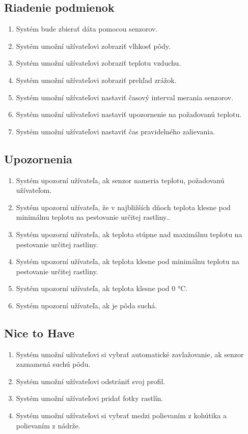 \documentclass[twoside]{ctuthesis}
\theoremstyle{plain}
\theoremstyle{definition}
\theoremstyle{note}
\begin{document}
\subsection*{Riadenie podmienok}
\begin{enumerate}
\item Systém bude zbierať dáta pomocou senzorov.
\item Systém umožní užívateľovi zobraziť  vlhkosť pôdy.
\item Systém umožní užívateľovi zobraziť  teplotu vzduchu. 
\item Systém umožní užívateľovi zobraziť prehľad zrážok.
\item Systém umožní užívateľovi nastaviť časový interval merania senzorov.
\item Systém umožní užívateľovi nastaviť upozornenie na požadovanú teplotu.
\item Systém umožní užívateľovi nastaviť čas pravidelného zalievania.
\end{enumerate}

\subsection*{Upozornenia}
\begin{enumerate}
\item Systém upozorní užívateľa, ak senzor nameria teplotu, požadovanú užívateľom.
\item Systém upozorní užívateľa, že v najbližších dňoch teplota klesne pod minimálnu teplotu na pestovanie určitej rastliny..
\item Systém upozorní užívateľa, ak teplota stúpne nad maximálnu teplotu na pestovanie určitej rastliny.
\item Systém upozorní užívateľa, ak teplota klesne pod minimálnu teplotu na pestovanie určitej rastliny.
\item Systém upozorní užívateľa, ak teplota klesne pod 0 °C.
\item Systém upozorní užívateľa, ak je pôda suchá.
\end{enumerate}

\subsection*{Nice to Have}
\begin{enumerate}
\item Systém umožní užívateľovi si vybrať automatické zavlažovanie, ak senzor zaznamená suchú pôdu. 
\item Systém umožní užívateľovi odstrániť svoj profil.
\item Systém umožní užívateľovi pridať fotky rastlín.
\item Systém umožní užívateľovi si vybrať medzi polievaním z kohútika a polievaním z nádrže.
\end{enumerate}
\end{document}
